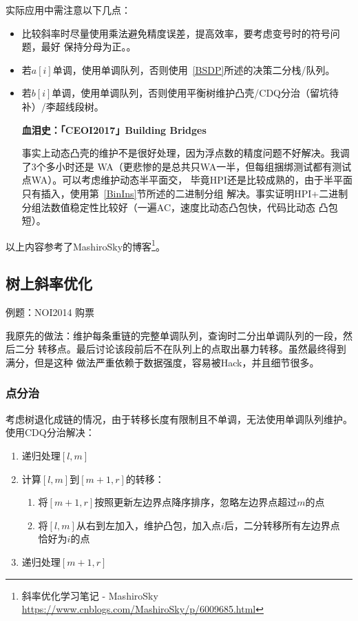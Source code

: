 实际应用中需注意以下几点：
\begin{itemize}
    \item 比较斜率时尽量使用乘法避免精度误差，提高效率，要考虑变号时的符号问题，最好
    保持分母为正。。
    \item 若$a[i]$单调，使用单调队列，否则使用~\ref{BSDP}所述的决策二分栈/队列。
    \item 若$b[i]$单调，使用单调队列，否则使用平衡树维护凸壳/CDQ分治（留坑待补）/李超线段树。

    {\bfseries 血泪史：「CEOI2017」Building Bridges

    事实上动态凸壳的维护不是很好处理，因为浮点数的精度问题不好解决。我调了3个多小时还是
    WA（更悲惨的是总共只WA一半，但每组捆绑测试都有测试点WA）。可以考虑维护动态半平面交，
    毕竟HPI还是比较成熟的，由于半平面只有插入，使用第~\ref{BinIns}节所述的二进制分组
    解决。事实证明HPI+二进制分组法数值稳定性比较好（一遍AC，速度比动态凸包快，代码比动态
    凸包短）。
    }
\end{itemize}

以上内容参考了MashiroSky的博客\footnote{斜率优化学习笔记 - MashiroSky
    \url{https://www.cnblogs.com/MashiroSky/p/6009685.html}
}。
\subsection{树上斜率优化}
例题：NOI2014 购票

我原先的做法：维护每条重链的完整单调队列，查询时二分出单调队列的一段，然后二分
转移点。最后讨论该段前后不在队列上的点取出暴力转移。虽然最终得到满分，但是这种
做法严重依赖于数据强度，容易被Hack，并且细节很多。
\subsubsection{点分治}
考虑树退化成链的情况，由于转移长度有限制且不单调，无法使用单调队列维护。使用CDQ分治解决：
\begin{enumerate}
    \item 递归处理$[l,m]$
    \item 计算$[l,m]$到$[m+1,r]$的转移：
    \begin{enumerate}
        \item 将$[m+1,r]$按照更新左边界点降序排序，忽略左边界点超过$m$的点
        \item 将$[l,m]$从右到左加入，维护凸包，加入点$i$后，二分转移所有左边界点
        恰好为$i$的点
    \end{enumerate}
    \item 递归处理$[m+1,r]$
\end{enumerate}

